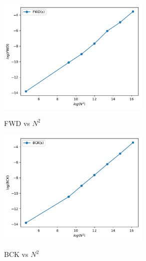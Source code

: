 \documentclass{article}
\begin{document}
\begin{figure}[H]
    \centering
    \caption{FWD vs $N^2$}
    \includegraphics[width=0.65\textwidth]{src/FWD.pdf}
    \label{fig:fwd}
\end{figure}
\begin{figure}[H]
    \centering
    \caption{BCK vs $N^2$}
    \includegraphics[width=0.65\textwidth]{src/BCK.pdf}
    \label{fig:bck}
\end{figure}
\end{document}
